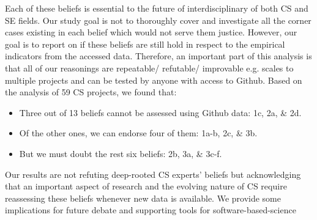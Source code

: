 \documentclass[sigconf,review,anonymous]{acmart}
\newcommand{\bi}{\begin{itemize}}
\newcommand{\ei}{\end{itemize}}
\begin{document}
Each of these beliefs is essential to the future of interdisciplinary of both CS and SE fields. Our study goal is not to thoroughly cover and investigate all the corner cases existing in each belief which would not serve them justice. However, our goal is to report on if these beliefs are still hold in respect to the empirical indicators from the accessed data. Therefore, an important part of this analysis is that all of our reasonings are repeatable/ refutable/ improvable e.g. scales to multiple projects and can be tested by anyone with access to Github.
Based on the analysis of 59 CS projects, we found that:
\bi
\item Three out of 13 beliefs cannot be assessed using Github data: 1c, 2a, \& 2d. 
\item Of the other ones, we can endorse four of them:  1a-b, 2c, \& 3b.
\item But we must doubt the rest six beliefs: 2b, 3a, \& 3c-f. 
\ei

Our results are not refuting deep-rooted CS experts' beliefs but acknowledging that an important aspect of research and the evolving nature of CS require reassessing these beliefs whenever new data is available. We provide some implications for future debate and supporting tools for software-based-science 






\end{document}
